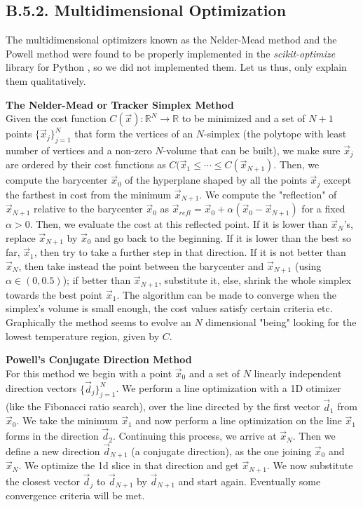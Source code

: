 \documentclass[11pt, a4paper, twoside]{article} %
\newcommand{\R}{\mathbb{R}} %
\DeclareRobustCommand{\mybox}[2][gray!10]{%
\begin{tcolorbox}[   %
        left=0.2cm,
        right=0.2cm,
        top=0.15cm,
        bottom=0.15cm,
        colback=#1,
        colframe=#1,
        width=\dimexpr\textwidth\relax, 
        enlarge left by=0mm,
        boxsep=5pt,
        arc=0pt,outer arc=0pt,
        ]
        #2
\end{tcolorbox}
}
\begin{document}
\subsection*{B.5.2. Multidimensional Optimization}
The multidimensional optimizers known as the Nelder-Mead method and the Powell method were found to be properly implemented in the {\em scikit-optimize} library for Python \cite{skopt}, so we did not implemented them. Let us thus, only explain them qualitatively.
\mybox{{\bf The Nelder-Mead or Tracker Simplex Method \cite{NM,opt}\vspace{0.2cm}}\\
Given the cost function $C(\vec{x}):\R^N\rightarrow\R$ to be minimized and a set of $N+1$ points $\{\vec{x}_j\}_{j=1}^N$ that form the vertices of an $N$-simplex (the polytope with least number of vertices and a non-zero $N$-volume that can be built), we make sure $\vec{x}_j$ are ordered by their cost functions as $C(\vec{x}_1\leq\cdots\leq C(\vec{x}_{N+1})$. Then, we compute the barycenter $\vec{x}_0$ of the hyperplane shaped by all the points $\vec{x}_j$ except the farthest in cost from the minimum $\vec{x}_{N+1}$. We compute the "reflection" of $\vec{x}_{N+1}$ relative to the barycenter $\vec{x}_0$ as $\vec{x}_{refl}=\vec{x}_0+\alpha(\vec{x}_0-\vec{x}_{N+1})$ for a fixed $\alpha>0$. Then, we evaluate the cost at this reflected point. If it is lower than $\vec{x}_N$'s, replace $\vec{x}_{N+1}$ by $\vec{x}_0$ and go back to the beginning. If it is lower than the best so far, $\vec{x}_1$, then try to take a further step in that direction. If it is not better than $\vec{x}_N$, then take instead the point between the barycenter and $\vec{x}_{N+1}$ (using $\alpha\in(0,0.5)$); if better than $\vec{x}_{N+1}$, substitute it, else, shrink the whole simplex towards the best point $\vec{x}_1$. The algorithm can be made to converge when the simplex's volume is small enough, the cost values satisfy certain criteria etc. Graphically the method seems to evolve an $N$ dimensional "being" looking for the lowest temperature region, given by $C$.\vspace*{0.3cm}}
\mybox{
{\bf Powell's Conjugate Direction Method \cite{P,opt} \vspace{0.2cm}\\}
For this method we begin with a point $\vec{x}_0$ and a set of $N$ linearly independent direction vectors $\{\vec{d}_j\}_{j=1}^N$. We perform a line optimization with a 1D otimizer (like the Fibonacci ratio search), over the line directed by the first vector $\vec{d}_1$ from $\vec{x}_0$. We take the minimum $\vec{x}_1$ and now perform a line optimization on the line $\vec{x}_1$ forms in the direction $\vec{d}_2$. Continuing this process, we arrive at $\vec{x}_N$. Then we define a new direction $\vec{d}_{N+1}$ (a conjugate direction), as the one joining $\vec{x}_0$ and $\vec{x}_N$. We optimize the 1d slice in that direction and get $\vec{x}_{N+1}$. We now substitute the closest vector $\vec{d}_j$ to $\vec{d}_{N+1}$ by $\vec{d}_{N+1}$ and start again. Eventually some convergence criteria will be met.

}
\end{document}
